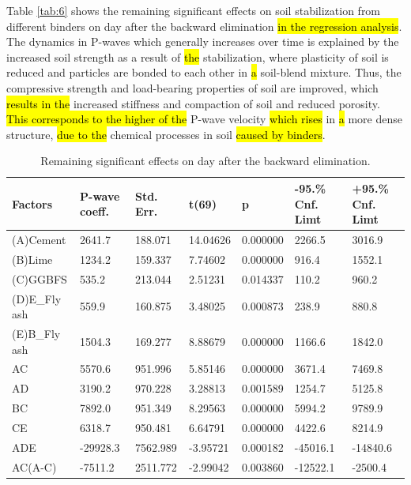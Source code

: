 \documentclass[materials,article,submit,pdftex,moreauthors]{Definitions/mdpi}
\begin{document}
Table \ref{tab:6} shows the remaining significant effects on soil stabilization from different binders on day  after the backward elimination \hl{in the regression analysis}. The dynamics in P-waves which generally increases over time is explained by the increased soil strength as a result\hl{ }of \hl{the} stabilization, where plasticity of soil is reduced and particles are bonded to each other in \hl{a} soil-blend mixture. Thus, the compressive strength and load-bearing properties of soil are improved, which \hl{results in the} increased stiffness and compaction of\hl{ }soil and reduced porosity. \hl{This corresponds to the higher of the} P-wave velocity \hl{which rises} in \hl{a} more dense structure, \hl{due to the} chemical processes\hl{ }in soil\hl{ caused by binders}. 

\begin{table}[H]
\begin{threeparttable}
\caption{Remaining significant effects on day  after the backward elimination.}
\footnotesize
    \centering
    \begin{tabular}{|l|l|l|l|l|l|l|}
    \hline
        Factors & P-wave coeff. & Std. Err. & t(69) & p & -95.\% Cnf. Limt & +95.\% Cnf. Limt \\ \hline
        (A)Cement & 2641.7 & 188.071 & 14.04626 & 0.000000 & 2266.5 & 3016.9 \\ \hline
        (B)Lime & 1234.2 & 159.337 & 7.74602 & 0.000000 & 916.4 & 1552.1 \\ \hline
        (C)GGBFS & 535.2 & 213.044 & 2.51231 & 0.014337 & 110.2 & 960.2 \\ \hline
        (D)E\_Fly ash & 559.9 & 160.875 & 3.48025 & 0.000873 & 238.9 & 880.8 \\ \hline
        (E)B\_Fly ash & 1504.3 & 169.277 & 8.88679 & 0.000000 & 1166.6 & 1842.0 \\ \hline
        AC & 5570.6 & 951.996 & 5.85146 & 0.000000 & 3671.4 & 7469.8 \\ \hline
        AD & 3190.2 & 970.228 & 3.28813 & 0.001589 & 1254.7 & 5125.8 \\ \hline
        BC & 7892.0 & 951.349 & 8.29563 & 0.000000 & 5994.2 & 9789.9 \\ \hline
        CE & 6318.7 & 950.481 & 6.64791 & 0.000000 & 4422.6 & 8214.9 \\ \hline
        ADE & -29928.3 & 7562.989 & -3.95721 & 0.000182 & -45016.1 & -14840.6 \\ \hline
        AC(A-C) & -7511.2 & 2511.772 & -2.99042 & 0.003860 & -12522.1 & -2500.4 \\ \hline

\end{tabular}
\end{threeparttable}
\end{table}
\end{document}

